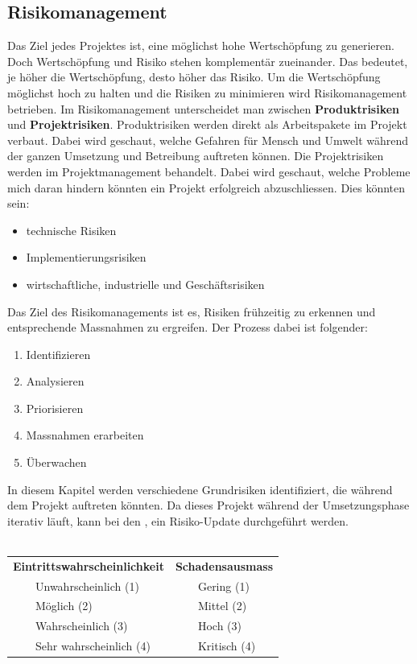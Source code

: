 \documentclass[a4paper, table]{article}
\newcommand{\tabitem}{~~\llap{\textbullet}~~}
\begin{document}
\subsection{Risikomanagement}
Das Ziel jedes Projektes ist, eine möglichst hohe Wertschöpfung zu generieren.
Doch Wertschöpfung und Risiko stehen komplementär zueinander.
Das bedeutet, je höher die Wertschöpfung, desto höher das Risiko.
Um die Wertschöpfung möglichst hoch zu halten und die Risiken zu minimieren wird Risikomanagement betrieben.
Im Risikomanagement unterscheidet man zwischen \textbf{Produktrisiken} und \textbf{Projektrisiken}.
\newline
Produktrisiken werden direkt als Arbeitspakete im Projekt verbaut.
Dabei wird geschaut, welche Gefahren für Mensch und Umwelt während der ganzen Umsetzung und Betreibung auftreten können.
\newline
Die Projektrisiken werden im Projektmanagement behandelt.
Dabei wird geschaut, welche Probleme mich daran hindern könnten ein Projekt erfolgreich abzuschliessen.
Dies könnten sein:
\begin{itemize}
    \item technische Risiken
    \item Implementierungsrisiken
    \item wirtschaftliche, industrielle und Geschäftsrisiken
\end{itemize}
\noindent
Das Ziel des Risikomanagements ist es, Risiken frühzeitig zu erkennen und entsprechende Massnahmen zu ergreifen.
Der Prozess dabei ist folgender:
\begin{enumerate}
    \item Identifizieren
    \item Analysieren
    \item Priorisieren
    \item Massnahmen erarbeiten
    \item Überwachen \autocite[p.~8-16]{peter_sollberger_risikomanagement_2021}
\end{enumerate}
\noindent
In diesem Kapitel werden verschiedene Grundrisiken identifiziert, die während dem Projekt auftreten könnten.
Da dieses Projekt während der Umsetzungsphase iterativ läuft, kann bei den , ein Risiko-Update durchgeführt werden.\\\\

\begin{tabular}[h]{ll}
    \textbf{Eintrittswahrscheinlichkeit} & \textbf{Schadensausmass} \\
    \tabitem Unwahrscheinlich (1) & \tabitem Gering (1) \\
    \tabitem Möglich (2) & \tabitem Mittel (2) \\
    \tabitem Wahrscheinlich (3) & \tabitem Hoch (3) \\
    \tabitem Sehr wahrscheinlich (4) & \tabitem Kritisch (4) \\
\end{tabular}
\clearpage
\end{document}
